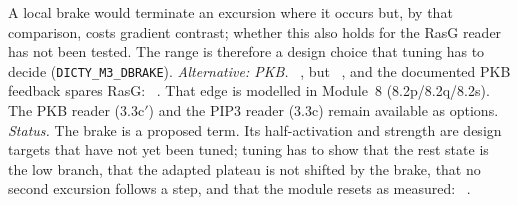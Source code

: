 \begin{description}
A local brake would terminate an excursion where it occurs but, by that comparison, costs gradient contrast; whether this also holds for the RasG reader has not been tested. The range is therefore a design choice that tuning has to decide (\texttt{DICTY\_M3\_DBRAKE}).
\emph{Alternative: PKB.} ~\cite{miao2017}, but ~\cite{miao2017}, and the documented PKB feedback spares RasG: ~\cite{charest2010}. That edge is modelled in Module~8 (8.2p/8.2q/8.2s). The PKB reader (3.3c$'$) and the PIP3 reader (3.3c) remain available as options.
\emph{Status.} The brake is a proposed term. Its half-activation and strength are design targets that have not yet been tuned; tuning has to show that the rest state is the low branch, that the adapted plateau is not shifted by the brake, that no second excursion follows a step, and that the module resets as measured: ~\cite{xu2022}.
\end{description}

